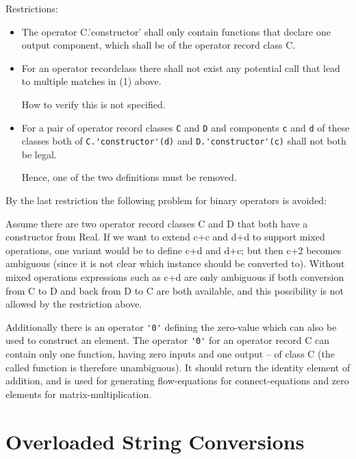 Restrictions:
\begin{itemize}
\item
  The operator C.'constructor' shall only contain functions that declare
  one output component, which shall be of the operator record class C.
\item
  For an operator recordclass there shall not exist any potential call
  that lead to multiple matches in (1) above.
  \begin{nonnormative}
  How to verify this is not specified.
  \end{nonnormative}
\item
  For a pair of operator record classes \lstinline!C! and \lstinline!D! and components \lstinline!c! and \lstinline!d!
  of these classes both of \lstinline!C.'constructor'(d)! and \lstinline!D.'constructor'(c)!
  shall not both be legal.
  \begin{nonnormative}
   Hence, one of the two definitions must be removed.
  \end{nonnormative}
\end{itemize}

\begin{nonnormative}
By the last restriction the following problem for binary
operators is avoided:

Assume there are two operator record classes C and D that both
have a constructor from Real. If we want to extend c+c and d+d to
support mixed operations, one variant would be to define c+d and d+c;
but then c+2 becomes ambiguous (since it is not clear which instance
should be converted to). Without mixed operations expressions such as
c+d are only ambiguous if both conversion from C to D and back from D to
C are both available, and this possibility is not allowed by the
restriction above.
\end{nonnormative}

Additionally there is an operator \lstinline!'0'! defining the zero-value which can
also be used to construct an element. The operator \lstinline!'0'! for an operator
record C can contain only one function, having zero inputs and one
output -- of class C (the called function is therefore unambiguous). It
should return the identity element of addition, and is used for
generating flow-equations for connect-equations and zero elements for
matrix-multiplication.

\section{Overloaded String Conversions}

